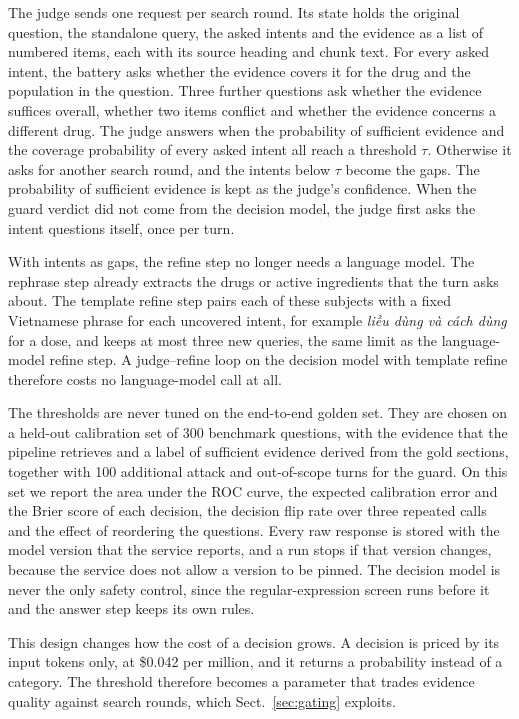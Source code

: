 The judge sends one request per search round. Its state holds the original question, the standalone query, the asked intents and the evidence as a list of numbered items, each with its source heading and chunk text. For every asked intent, the battery asks whether the evidence covers it for the drug and the population in the question. Three further questions ask whether the evidence suffices overall, whether two items conflict and whether the evidence concerns a different drug. The judge answers when the probability of sufficient evidence and the coverage probability of every asked intent all reach a threshold $\tau$. Otherwise it asks for another search round, and the intents below $\tau$ become the gaps. The probability of sufficient evidence is kept as the judge's confidence. When the guard verdict did not come from the decision model, the judge first asks the intent questions itself, once per turn.

With intents as gaps, the refine step no longer needs a language model. The rephrase step already extracts the drugs or active ingredients that the turn asks about. The template refine step pairs each of these subjects with a fixed Vietnamese phrase for each uncovered intent, for example \textit{liều dùng và cách dùng} for a dose, and keeps at most three new queries, the same limit as the language-model refine step. A judge--refine loop on the decision model with template refine therefore costs no language-model call at all.

The thresholds are never tuned on the end-to-end golden set. They are chosen on a held-out calibration set of 300 benchmark questions, with the evidence that the pipeline retrieves and a label of sufficient evidence derived from the gold sections, together with 100 additional attack and out-of-scope turns for the guard. On this set we report the area under the ROC curve, the expected calibration error and the Brier score of each decision, the decision flip rate over three repeated calls and the effect of reordering the questions. Every raw response is stored with the model version that the service reports, and a run stops if that version changes, because the service does not allow a version to be pinned. The decision model is never the only safety control, since the regular-expression screen runs before it and the answer step keeps its own rules.

This design changes how the cost of a decision grows. A decision is priced by its input tokens only, at \$0.042 per million, and it returns a probability instead of a category. The threshold therefore becomes a parameter that trades evidence quality against search rounds, which Sect.~\ref{sec:gating} exploits.

